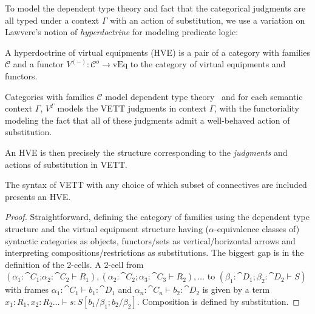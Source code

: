 \documentclass{llncs}
\begin{document}
To model the dependent type theory and fact that the categorical
judgments are all typed under a context $\Gamma$ with an action of
substitution, we use a variation on Lawvere's notion of
\emph{hyperdoctrine} for modeling predicate logic\cite{Lawvere69}:
\begin{definition}
  A hyperdoctrine of virtual equipments (HVE) is a pair of a category with
  families $\mathcal C$ and a functor $V^{(-)} : \mathcal C^o \to
  \text{vEq}$ to the category of virtual equipments and functors.
\end{definition}
Categories with families $\mathcal C$ model dependent type
theory~\cite{dybjer-cwf} and for each semantic context $\Gamma$,
$V^\Gamma$ models the VETT judgments in context $\Gamma$, with the
functoriality modeling the fact that all of these judgments admit a
well-behaved action of substitution.

An HVE is then precisely the structure corresponding to the
\emph{judgments} and actions of substitution in VETT.
\begin{construction}
  \label{cons:syn-model}
  The syntax of VETT with any choice of which subset of connectives
  are included presents an HVE.
\end{construction}
\begin{proof}
  Straightforward, defining the category of families using the dependent
  type structure and the virtual equipment structure having
  ($\alpha$-equivalence classes of) syntactic categories as objects,
  functors/sets as vertical/horizontal arrows and interpreting
  compositions/restrictions as substitutions.  The biggest gap is in the
  definition of the 2-cells.  A 2-cell from\\ $(\alpha_1:\cat
  C_1\mathord{;}\alpha_2:\cat C_2\vdash R_1),(\alpha_2:\cat
  C_2;\alpha_3:\cat C_3 \vdash R_2),\ldots$ to $(\beta_1:\cat
  D_1;\beta_2 : \cat D_2\vdash S)$ with frames $\alpha_1:\cat C_1\vdash b_1 : \cat
  D_1$ and $\alpha_n:\cat C_n\vdash b_2 : \cat D_2$ is given by a term
  $x_1:R_1,x_2:R_2\ldots \vdash s :
  S[b_1/\beta_1;b_2/\beta_2]$. Composition is defined by substitution.
\end{proof}
\end{document}
